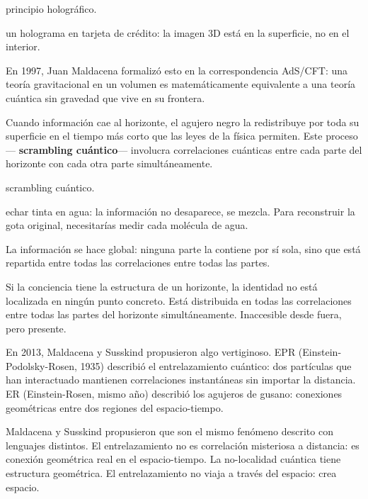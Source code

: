\begin{fisica}
 principio holográfico.

 un holograma en tarjeta de crédito: la imagen 3D está en la superficie, no en el interior.
\end{fisica}
En 1997, Juan Maldacena formalizó esto en la correspondencia AdS/CFT: una teoría gravitacional en un volumen es matemáticamente equivalente a una teoría cuántica sin gravedad que vive en su frontera.

\noindent Cuando información cae al horizonte, el agujero negro la redistribuye por toda su superficie en el tiempo más corto que las leyes de la física permiten. Este proceso — \textbf{scrambling cuántico}— involucra correlaciones cuánticas entre cada parte del horizonte con cada otra parte simultáneamente.

\begin{fisica}
 scrambling cuántico.

 echar tinta en agua: la información no desaparece, se mezcla. Para reconstruir la gota original, necesitarías medir cada molécula de agua.
\end{fisica}
La información se hace global: ninguna parte la contiene por sí sola, sino que está repartida entre todas las correlaciones entre todas las partes.

Si la conciencia tiene la estructura de un horizonte, la identidad no está localizada en ningún punto concreto. Está distribuida en todas las correlaciones entre todas las partes del horizonte simultáneamente. Inaccesible desde fuera, pero presente.

\noindent En 2013, Maldacena y Susskind propusieron algo vertiginoso. EPR (Einstein-Podolsky-Rosen, 1935) describió el entrelazamiento cuántico: dos partículas que han interactuado mantienen correlaciones instantáneas sin importar la distancia. ER (Einstein-Rosen, mismo año) describió los agujeros de gusano: conexiones geométricas entre dos regiones del espacio-tiempo.

Maldacena y Susskind propusieron que son el mismo fenómeno descrito con lenguajes distintos. El entrelazamiento no es correlación misteriosa a distancia: es conexión geométrica real en el espacio-tiempo. La no-localidad cuántica tiene estructura geométrica. El entrelazamiento no viaja a través del espacio: crea espacio.

